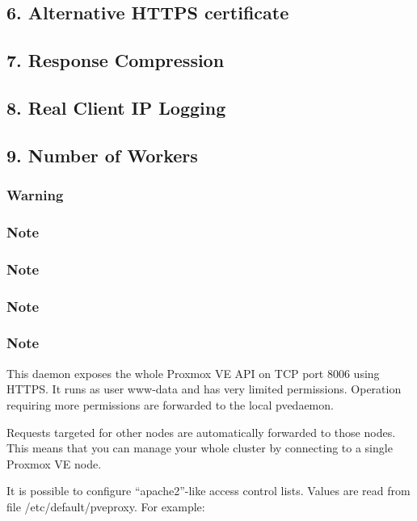 \subsection{6. Alternative HTTPS certificate}

\subsection{7. Response Compression}

\subsection{8. Real Client IP Logging}

\subsection{9. Number of Workers}

\subsubsection{Warning}

\subsubsection{Note}

\subsubsection{Note}

\subsubsection{Note}

\subsubsection{Note}

This daemon exposes the whole Proxmox VE API on TCP port 8006 using HTTPS. It runs as user www-data and has very limited permissions. Operation requiring more permissions are forwarded to the local pvedaemon.

Requests targeted for other nodes are automatically forwarded to those nodes. This means that you can manage your whole cluster by connecting to a single Proxmox VE node.

It is possible to configure “apache2”-like access control lists. Values are read from file /etc/default/pveproxy. For example:

